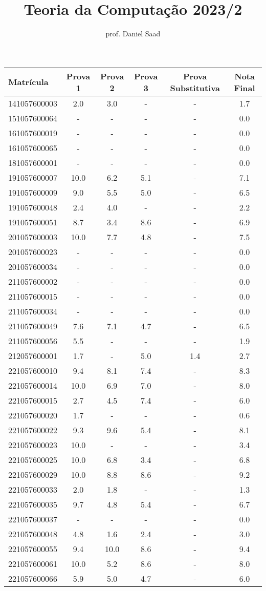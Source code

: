 \documentclass{article}
\title{ Teoria da Computação 2023/2}
\date{}
\author{ prof. Daniel Saad}
\begin{document}
 \maketitle
    \begin{longtable}{|l|c|c|c|c|c|}
    \hline
Matrícula & Prova 1 & Prova 2 & Prova 3 & Prova Substitutiva & Nota Final\\\hline \endhead   
141057600003 & 2.0 & 3.0 & - & - & 1.7\\\hline
151057600064 & - & - & - & - & 0.0\\\hline
161057600019 & - & - & - & - & 0.0\\\hline
161057600065 & - & - & - & - & 0.0\\\hline
181057600001 & - & - & - & - & 0.0\\\hline
191057600007 & 10.0 & 6.2 & 5.1 & - & 7.1\\\hline
191057600009 & 9.0 & 5.5 & 5.0 & - & 6.5\\\hline
191057600048 & 2.4 & 4.0 & - & - & 2.2\\\hline
191057600051 & 8.7 & 3.4 & 8.6 & - & 6.9\\\hline
201057600003 & 10.0 & 7.7 & 4.8 & - & 7.5\\\hline
201057600023 & - & - & - & - & 0.0\\\hline
201057600034 & - & - & - & - & 0.0\\\hline
211057600002 & - & - & - & - & 0.0\\\hline
211057600015 & - & - & - & - & 0.0\\\hline
211057600034 & - & - & - & - & 0.0\\\hline
211057600049 & 7.6 & 7.1 & 4.7 & - & 6.5\\\hline
211057600056 & 5.5 & - & - & - & 1.9\\\hline
212057600001 & 1.7 & - & 5.0 & 1.4 & 2.7\\\hline
221057600010 & 9.4 & 8.1 & 7.4 & - & 8.3\\\hline
221057600014 & 10.0 & 6.9 & 7.0 & - & 8.0\\\hline
221057600015 & 2.7 & 4.5 & 7.4 & - & 6.0\\\hline
221057600020 & 1.7 & - & - & - & 0.6\\\hline
221057600022 & 9.3 & 9.6 & 5.4 & - & 8.1\\\hline
221057600023 & 10.0 & - & - & - & 3.4\\\hline
221057600025 & 10.0 & 6.8 & 3.4 & - & 6.8\\\hline
221057600029 & 10.0 & 8.8 & 8.6 & - & 9.2\\\hline
221057600033 & 2.0 & 1.8 & - & - & 1.3\\\hline
221057600035 & 9.7 & 4.8 & 5.4 & - & 6.7\\\hline
221057600037 & - & - & - & - & 0.0\\\hline
221057600048 & 4.8 & 1.6 & 2.4 & - & 3.0\\\hline
221057600055 & 9.4 & 10.0 & 8.6 & - & 9.4\\\hline
221057600061 & 10.0 & 5.2 & 8.6 & - & 8.0\\\hline
221057600066 & 5.9 & 5.0 & 4.7 & - & 6.0\\\hline
\end{longtable}
\end{document}
